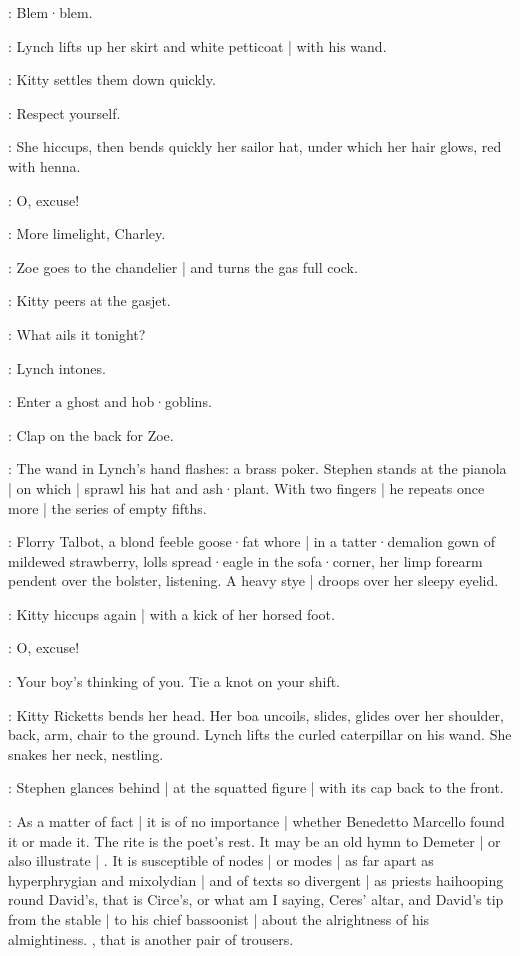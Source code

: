 \Kitty:
Blem·blem.

:
Lynch lifts up her skirt and white petticoat |
with his wand.

:
Kitty settles them down quickly.

\Kitty:
Respect yourself.

:
She hiccups,
then bends quickly her sailor hat,
under which her hair glows,
red with henna.

\Kitty:
O,
excuse!

\Zoe:
More limelight,
Charley.

:
Zoe goes to the chandelier |
and turns the gas full cock.

:
Kitty peers at the gasjet.

\Kitty:
What ails it tonight?

:
Lynch intones.

\Lynch:
Enter a ghost and hob·goblins.

\Zoe:
Clap on the back for Zoe.

:
The wand in Lynch's hand flashes:
a brass poker.
Stephen stands at the pianola |
on which |
sprawl his hat and ash·plant.
With two fingers |
he repeats once more |
the series of empty fifths.

:
Florry Talbot,
a blond feeble goose·fat whore |
in a tatter·demalion gown of mildewed strawberry,
lolls spread·eagle in the sofa·corner,
her limp forearm pendent over the bolster,
listening.
A heavy stye |
droops over her sleepy eyelid.

:
Kitty hiccups again |
with a kick of her horsed foot.

\Kitty:
O,
excuse!

\Zoe:
Your boy's thinking of you.
Tie a knot on your shift.

:
Kitty Ricketts bends her head.
Her boa uncoils,
slides,
glides over her shoulder,
back,
arm,
chair to the ground.
Lynch lifts the curled caterpillar on his wand.
She snakes her neck,
nestling.

:
Stephen glances behind |
at the squatted figure |
with its cap back to the front.

\Stephen:
As a matter of fact |
it is of no importance |
whether Benedetto Marcello found it or made it.
The rite is the poet's rest.
It may be an old hymn to Demeter |
or also illustrate |
.
It is susceptible of nodes |
or modes |
as far apart as hyperphrygian and mixolydian |
and of texts so divergent |
as priests haihooping round David's,
that is Circe's,
or what am I saying,
Ceres' altar,
and David's tip from the stable |
to his chief bassoonist |
about the alrightness of his almightiness.
,
that is another pair of trousers.

